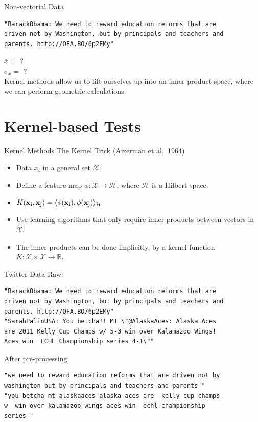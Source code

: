 \documentclass{beamer}
\begin{document}
\begin{frame}[fragile]{Non-vectorial Data}
\begin{verbatim}
"BarackObama: We need to reward education reforms that are
driven not by Washington, but by principals and teachers and
parents. http://OFA.BO/6p2EMy"
\end{verbatim}
\pause

$\bar{x} = $ ? \\ \pause
$\hat{\sigma}_x = $ ? \\ \pause
Kernel methods allow us to lift ourselves up into an inner product space, where we can perform geometric calculations.
\end{frame}

\section{Kernel-based Tests}
\begin{frame}{Kernel Methods}
  The Kernel Trick (Aizerman et al.\ 1964) \pause
  \begin{itemize}
  \item Data $x_i$ in a general set $\mathcal{X}$. \pause
  \item Define a feature map $\phi : \mathcal{X} \to \mathcal{H}$, where $\mathcal{H}$ is a Hilbert space. \pause
  \item $K({\bf x_i}, {\bf x_j}) = \langle \phi({\bf x_i}), \phi({\bf x_j}) \rangle_{\mathcal{H}}$ \pause
  \item Use learning algorithms that only require inner products between vectors in $\mathcal{X}$. \pause
  \item The inner products can be done implicitly, by a kernel function $K: \mathcal{X} \times \mathcal{X} \to \mathbb{R}$.
  \end{itemize}
\end{frame}

\begin{frame}[fragile]{Twitter Data}
  Raw:
\begin{verbatim}
"BarackObama: We need to reward education reforms that are
driven not by Washington, but by principals and teachers and
parents. http://OFA.BO/6p2EMy"
"SarahPalinUSA: You betcha!! MT \"@AlaskaAces: Alaska Aces
are 2011 Kelly Cup Champs w/ 5-3 win over Kalamazoo Wings!
Aces win  ECHL Championship series 4-1\""
\end{verbatim}
  After pre-processing:
\begin{verbatim}
"we need to reward education reforms that are driven not by
washington but by principals and teachers and parents "
"you betcha mt alaskaaces alaska aces are  kelly cup champs
w  win over kalamazoo wings aces win  echl championship
series "
\end{verbatim}
\end{frame}
\end{document}
